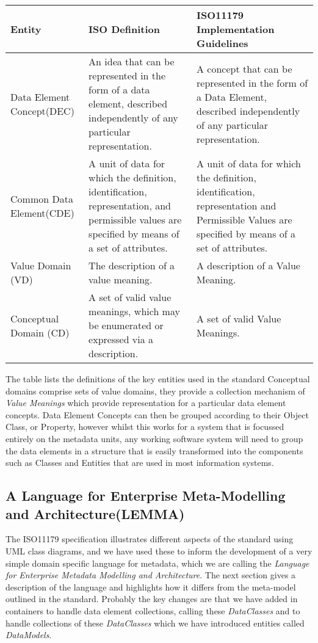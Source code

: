 \begin{table}[h]
	\begin{tabular}{ p{1.8cm} p{2.8cm}  p{3.0cm}  }  %
		\hline
		Entity & ISO Definition & ISO11179 Implementation Guidelines  \\ 
		\hline
		Data Element Concept(DEC) & An idea that can be represented in the form of a data element, described independently of any particular representation. & A concept that can be represented in the form of a Data Element, described independently of any particular representation.\\
		Common Data Element(CDE) & A unit of data for which the definition, identification, representation, and permissible values are specified by means of a set of attributes. & A unit of data for which the definition, identification, representation and Permissible Values are specified by means of a set of attributes. \\
		Value Domain (VD) & The description of a value meaning. & A description of a Value Meaning. \\
		Conceptual Domain (CD) & A set of valid value meanings, which may be enumerated or expressed via a description.& A set of valid Value Meanings.\\
		\hline
	\end{tabular}
\end{table}

The table lists the definitions of the key entities used in the standard
Conceptual domains comprise sets of value domains, they provide a collection mechanism of \emph{Value Meanings} which provide representation for a particular data element concepts. Data Element Concepts can then be grouped according to their Object Class, or Property, however whilst this works for a system that is focussed entirely on the metadata units, any working software system will need to group the data elements in a structure that is easily transformed into the components such as Classes and Entities that are used in most information systems.   



\subsection{A Language for Enterprise Meta-Modelling and Architecture(LEMMA) }

The ISO11179 specification illustrates different aspects of the standard using UML class diagrams, and we have used these to inform the development of a very simple domain specific language for metadata, which we are calling the \emph{Language for Enterprise Metadata Modelling and Architecture}. The next section gives a description of the language and highlights how it differs from the meta-model outlined in the standard. Probably the key changes are that we have added in containers to handle data element collections, calling these \emph{DataClasses} and to handle collections of these \emph{DataClasses} which we have introduced entities called \emph{DataModels}.

